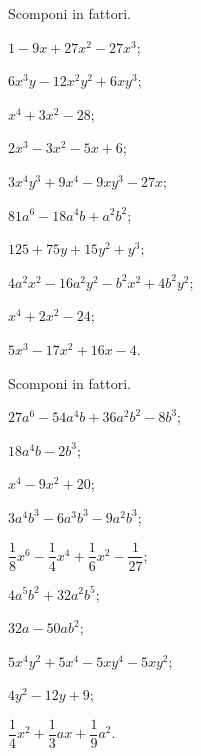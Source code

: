 \begin{esercizio}
 \label{ese:13.106}
 Scomponi in fattori.
 \begin{multicols}{2}
 \begin{enumeratea}
  \item $1 - 9x + 27x^{2} - 27x^{3}$;
\item $6x^{3}y-12x^{2}y^{2}+6xy^{3}$;
\item $x^{4} + 3x^{2} - 28 $;
\item $2x^{3} - 3x^{2} - 5x + 6$;
\item $3x^{4}y^{3} + 9x^{4} - 9xy^{3} - 27x$;
\item $81a^{6} - 18a^{4}b + a^{2}b^{2}$;
\item $125 + 75y + 15y^{2} + y^{3}$;
\item $4a^{2}x^{2} - 16a^{2}y^{2} - b^{2}x^{2} + 4b^{2}y^{2}$;
\item $x^{4} + 2x^{2} - 24$;
\item $5x^{3} - 17x^{2} + 16x - 4$.
 \end{enumeratea}
 \end{multicols}
\end{esercizio}

\begin{esercizio}
 \label{ese:13.107}
 Scomponi in fattori.
 \begin{multicols}{2}
 \begin{enumeratea}
\item $27a^{6} - 54a^{4}b + 36a^{2}b^{2} - 8b^{3}$;
\item $18a^{4}b - 2b^{3}$;
\item $x^{4} - 9x^{2} + 20$;
\item $3a^{4}b^{3} - 6a^{3}b^{3} - 9a^{2}b^{3}$;
\item $\dfrac{1}{8}x^{6}-\dfrac{1}{4}x^{4}+\dfrac{1}{6}x^{2}-\dfrac{1}{27}$;
\item $4a^{5}b^{2} + 32a^{2}b^{5}$;
\item $32a - 50ab^{2}$;
\item $5x^{4} y^{2} + 5x^{4} - 5xy^{4} - 5xy^{2}$;
\item $4y^{2} - 12y + 9$;
\item $\dfrac{1}{4}x^{2}+\dfrac{1}{3}ax+\dfrac{1}{9}a^{2}$.
 \end{enumeratea}
 \end{multicols}
\end{esercizio}

